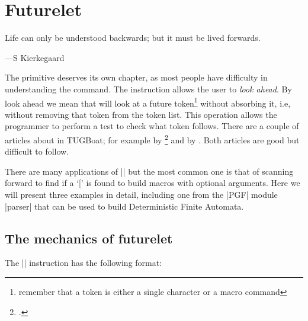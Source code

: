 

\chapter{Futurelet}
\epigraph{Life can only be understood backwards; but it must be lived forwards.}{
---S Kierkegaard}

The  primitive deserves its own chapter, as most people have difficulty in understanding the command. The instruction allows the user to \textit{look ahead}. By look ahead we mean that \tex will look at a future token\footnote{remember that a token is either a single character or a macro command} without absorbing it, i.e, without removing that token from the token list. This operation allows the programmer to perform a test to check what token follows. There are a couple of articles about  in TUGBoat; for example  by \citeauthor{Eijkhout2001}\footcite{Eijkhout2001} and  by \citeauthor{bechto88}. Both articles are good but difficult to follow. 

There are many applications of |\futurelet| but the most common one is that of scanning forward
to find if a `[' is found to build \latexe macros with optional arguments. Here we will  present three examples in detail, including one from the |PGF| module |parser| that can be used to build Deterministic Finite Automata.


\section{The mechanics of futurelet}

The |\futurelet| instruction has the following format:


\begin{commands}[]{}
\cmd{\futurelet} 
\end{commands}


